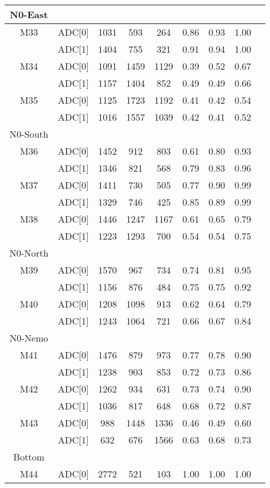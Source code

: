 \begin{longtable}{c c c c c c c c c}
  \midrule
  N0-East\\
  \midrule
  M33 & ADC[0] & 1031 & 593 & 264 & 0.86 & 0.93 & 1.00\\
      & ADC[1] & 1404 & 755 & 321 & 0.91 & 0.94 & 1.00\\
  M34 & ADC[0] & 1091 & 1459 & 1129 & 0.39 & 0.52 & 0.67\\
      & ADC[1] & 1157 & 1404 & 852 & 0.49 & 0.49 & 0.66\\
  M35 & ADC[0] & 1125 & 1723 & 1192 & 0.41 & 0.42 & 0.54\\
      & ADC[1] & 1016 & 1557 & 1039 & 0.42 & 0.41 & 0.52\\
  \midrule
  N0-South\\
  \midrule
  M36 & ADC[0] & 1452 & 912 & 803 & 0.61 & 0.80 & 0.93\\
      & ADC[1] & 1346 & 821 & 568 & 0.79 & 0.83 & 0.96\\
  M37 & ADC[0] & 1411 & 730 & 505 & 0.77 & 0.90 & 0.99\\
      & ADC[1] & 1329 & 746 & 425 & 0.85 & 0.89 & 0.99\\
  M38 & ADC[0] & 1446 & 1247 & 1167 & 0.61 & 0.65 & 0.79\\
      & ADC[1] & 1223 & 1293 & 700 & 0.54 & 0.54 & 0.75\\
  \midrule
  N0-North\\
  \midrule
  M39 & ADC[0] & 1570 & 967 & 734 & 0.74 & 0.81 & 0.95\\
      & ADC[1] & 1156 & 876 & 484 & 0.75 & 0.75 & 0.92\\
  M40 & ADC[0] & 1208 & 1098 & 913 & 0.62 & 0.64 & 0.79\\
      & ADC[1] & 1243 & 1064 & 721 & 0.66 & 0.67 & 0.84\\
  \midrule
  N0-Nemo\\
  \midrule
  M41 & ADC[0] & 1476 & 879 & 973 & 0.77 & 0.78 & 0.90\\
      & ADC[1] & 1238 & 903 & 853 & 0.72 & 0.73 & 0.86\\
  M42 & ADC[0] & 1262 & 934 & 631 & 0.73 & 0.74 & 0.90\\
      & ADC[1] & 1036 & 817 & 648 & 0.68 & 0.72 & 0.87\\
  M43 & ADC[0] & 988 & 1448 & 1336 & 0.46 & 0.49 & 0.60\\
      & ADC[1] & 632 & 676 & 1566 & 0.63 & 0.68 & 0.73\\
  \midrule
  Bottom\\
  \midrule
  M44 & ADC[0] & 2772 & 521 & 103 & 1.00 & 1.00 & 1.00\\

\end{longtable}
